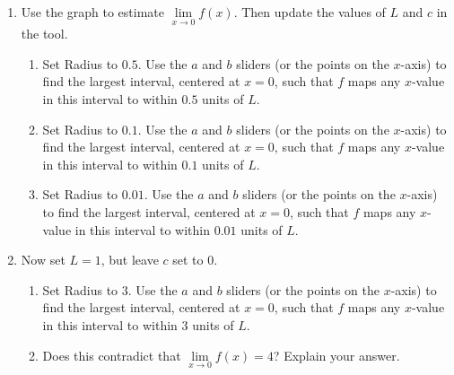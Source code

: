 \documentclass[handout,nooutcomes,noauthor,12pt]{Ximera}
\begin{document}
	
	\begin{enumerate}[label=\arabic*]
		\item Use the graph to estimate $ \lim\limits_{x \to 0}f(x) $.  Then update the values of $ L $ and $ c $ in the tool.    
		\begin{enumerate}[label=\alph*]
			\item Set Radius to $ 0.5 $.  Use the $ a $ and $ b $ sliders (or the points on the $ x $-axis) to find the largest interval, centered at $ x=0 $, such that $ f $ maps any $x$-value in this interval to within $ 0.5 $ units of $ L $.
			\item Set Radius to $ 0.1 $.  Use the $ a $ and $ b $ sliders (or the points on the $ x $-axis) to find the largest interval, centered at $ x=0 $, such that $ f $ maps any $x$-value in this interval to within $ 0.1 $ units of $ L $.
			\item Set Radius to $ 0.01 $.  Use the $ a $ and $ b $ sliders (or the points on the $ x $-axis) to find the largest interval, centered at $ x=0 $, such that $ f $ maps any $x$-value in this interval to within $ 0.01 $ units of $ L $.
		\end{enumerate}
		\clearpage
		\item Now set $ L=1 $, but leave $ c $ set to $ 0 $.
		\begin{enumerate}[label=\alph*]
			\item Set Radius to $ 3 $.  Use the $ a $ and $ b $ sliders (or the points on the $ x $-axis) to find the largest interval, centered at $ x=0 $, such that $ f $ maps any $x$-value in this interval to within $ 3 $ units of $ L $.
			\vspace{1cm}
			\item Does this contradict that $ \lim\limits_{x \to 0}f(x)=4 $?  Explain your answer.
		\end{enumerate}

		\clearpage
		

\end{enumerate}
\end{document}

